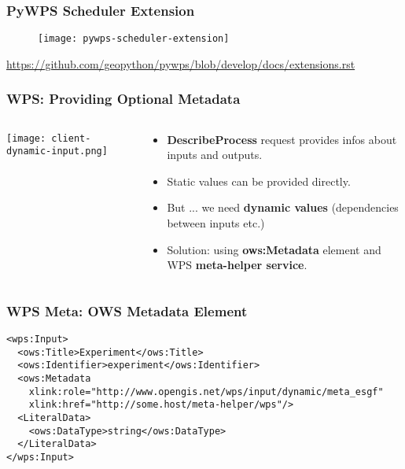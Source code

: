 \documentclass{beamer}
\begin{document}
\begin{frame}
\frametitle<presentation>{PyWPS Scheduler Extension}

  \begin{figure}[ht]
    \centering
    \texttt{[image: pywps-scheduler-extension]}
  \end{figure}

  \centering
  \footnotesize{\url{https://github.com/geopython/pywps/blob/develop/docs/extensions.rst}}

\end{frame}

\begin{frame}
\frametitle<presentation>{WPS: Providing Optional Metadata}

  \begin{columns}[c]
    \begin{column}{.5\textwidth}
      \centering
      \texttt{[image: client-dynamic-input.png]}
    \end{column}
    \begin{column}{.5\textwidth}
      \begin{itemize}
        \item {\bf DescribeProcess} request provides infos about inputs and outputs.
        \item Static values can be provided directly.
        \item But ... we need {\bf dynamic values} (dependencies between inputs etc.)
        \item Solution: using {\bf ows:Metadata} element and WPS {\bf meta-helper service}.
      \end{itemize}
    \end{column}
  \end{columns}

\end{frame}

\begin{frame}[fragile]
\frametitle<presentation>{WPS Meta: OWS Metadata Element}
  \lstset{language=XML}
  {\scriptsize
  \begin{lstlisting}
<wps:Input>
  <ows:Title>Experiment</ows:Title>
  <ows:Identifier>experiment</ows:Identifier>
  <ows:Metadata
    xlink:role="http://www.opengis.net/wps/input/dynamic/meta_esgf"
    xlink:href="http://some.host/meta-helper/wps"/>
  <LiteralData>
    <ows:DataType>string</ows:DataType>
  </LiteralData>
</wps:Input>
  \end{lstlisting}}

\end{frame}
\end{document}
